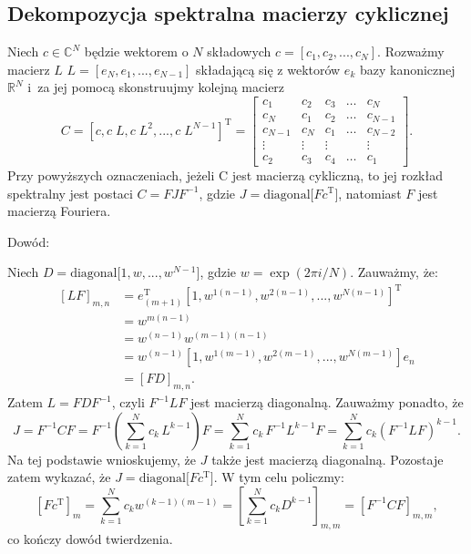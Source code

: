 \documentclass[a4paper,12pt,twoside]{article}
\begin{document}
\subsection*{Dekompozycja spektralna macierzy cyklicznej}

Niech $c\in\mathbb{C}^N$ b\k{e}dzie wektorem o $N$ sk{\l}adowych $c = [c_1, c_2, ..., c_{N}]$. Rozwa\.{z}my macierz $L$ $L = [e_N, e_1, ..., e_{N-1}]$ sk{\l}adaj\k{a}c\k{a} si\k{e} z wektor\'{o}w $e_k$ bazy kanonicznej $\mathbb{R}^N$ i~za jej pomoc\k{a} skonstruujmy kolejn\k{a} macierz
\begin{equation}
    C = [c, c\;L, c\;L^2, ..., c\;L^{N-1}]^\textrm{T} = \left[
\begin{array}{lllll}
      c_1 &  c_{2} &  c_{3} & \hdots & c_N     \\
      c_N &    c_1 &  c_{2} & \hdots & c_{N-1} \\
  c_{N-1} &    c_N &    c_1 & \hdots & c_{N-2} \\
   \vdots & \vdots & \vdots &        & \vdots  \\
    c_{2} &  c_{3} &  c_{4} & \hdots & c_1
\end{array}
\right].
\end{equation}
Przy powy\.{z}szych oznaczeniach, je\.{z}eli C jest macierz\k{a} cykliczn\k{a}, to jej rozk{\l}ad spektralny jest postaci $C = F J F^{-1}$, gdzie $J = \textrm{diagonal}\big[F c^\textrm{T}\big]$, natomiast $F$ jest macierz\k{a} Fouriera.

Dow\'{o}d:

Niech $D=\textrm{diagonal}\big[1,w,...,w^{N-1}\big]$, gdzie $w=\exp\left(2 \pi i /N\right)$. Zauwa\.{z}my, \.{z}e:
\begin{align*}
\left[L F\right]_{m,n}&= e_{(m+1)}^\textrm{T}\left[1, w^{1(n-1)},w^{2(n-1)},...,w^{N(n-1)}\right]^\textrm{T}\\
&= w^{m(n-1)}\\
&= w^{(n-1)} w^{(m-1)(n-1)}\\
&= w^{(n-1)} \left[1,w^{1(m-1)},w^{2(m-1)},...,w^{N(m-1)}\right] e_n\\
&=\left[F D\right]_{m,n}.
\end{align*}
Zatem $L = F D F^{-1}$, czyli $F^{-1} L F$ jest macierz\k{a} diagonaln\k{a}. Zauwa\.{z}my ponadto, \.{z}e
\begin{equation}
J = F^{-1} C F = F^{-1}\left(\sum_{k=1}^N c_k\,L^{k-1} \right) F
=\sum_{k=1}^N c_k\,F^{-1} L^{k-1} F
=\sum_{k=1}^N c_k\left(F^{-1} L F\right)^{k-1}.
\end{equation}
Na tej podstawie wnioskujemy, \.{z}e $J$ tak\.{z}e jest macierz\k{a} diagonaln\k{a}. Pozostaje zatem wykaza\'{c}, \.{z}e $J = \textrm{diagonal}\big[F c^\textrm{T}\big]$. W tym celu policzmy:
\begin{equation}
\left[F c^\textrm{T}\right]_m=\sum_{k=1}^N c_k w^{(k-1)(m-1)}
=\left[\sum_{k=1}^N c_k D^{k-1}\right]_{m,m}
=\left[F^{-1} C F\right]_{m,m},
\end{equation}
co ko\'{n}czy dow\'{o}d twierdzenia.
\end{document}
